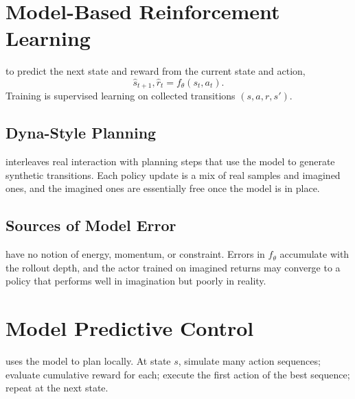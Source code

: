 
\newpage
\section{Model-Based Reinforcement Learning}


 to predict the next state and reward from the current state and action,
\begin{equation}
    \hat{s}_{t+1}, \hat{r}_t = f_\theta(s_t, a_t).
\end{equation}
Training is supervised learning on collected transitions $(s, a, r, s')$.

\subsection{Dyna-Style Planning}

 interleaves real interaction with planning steps that use the model to generate synthetic transitions. Each policy update is a mix of real samples and imagined ones, and the imagined ones are essentially free once the model is in place.

\subsection{Sources of Model Error}

 have no notion of energy, momentum, or constraint. Errors in $f_\theta$ accumulate with the rollout depth, and the actor trained on imagined returns may converge to a policy that performs well in imagination but poorly in reality.


\section{Model Predictive Control}


 uses the model to plan locally. At state $s$, simulate many action sequences; evaluate cumulative reward for each; execute the first action of the best sequence; repeat at the next state.

